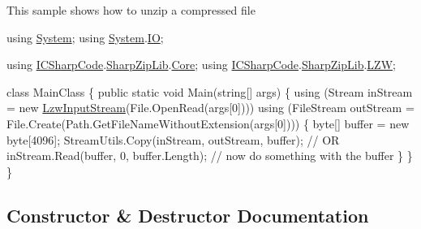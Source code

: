 This sample shows how to unzip a compressed file 
\begin{DoxyCode}
\textcolor{keyword}{using} \hyperlink{namespace_system}{System};
\textcolor{keyword}{using} \hyperlink{namespace_system}{System}.\hyperlink{namespace_system_1_1_i_o}{IO};

\textcolor{keyword}{using} \hyperlink{namespace_i_c_sharp_code}{ICSharpCode}.\hyperlink{namespace_i_c_sharp_code_1_1_sharp_zip_lib}{SharpZipLib}.\hyperlink{namespace_i_c_sharp_code_1_1_sharp_zip_lib_1_1_core}{Core};
\textcolor{keyword}{using} \hyperlink{namespace_i_c_sharp_code}{ICSharpCode}.\hyperlink{namespace_i_c_sharp_code_1_1_sharp_zip_lib}{SharpZipLib}.\hyperlink{namespace_i_c_sharp_code_1_1_sharp_zip_lib_1_1_l_z_w}{LZW};

\textcolor{keyword}{class }MainClass
\{
    \textcolor{keyword}{public} \textcolor{keyword}{static} \textcolor{keywordtype}{void} Main(\textcolor{keywordtype}{string}[] args)
    \{
        \textcolor{keyword}{using} (Stream inStream = \textcolor{keyword}{new} \hyperlink{class_i_c_sharp_code_1_1_sharp_zip_lib_1_1_l_z_w_1_1_lzw_input_stream_a0b2d345fb6423874386e68cf1e13eb93}{LzwInputStream}(File.OpenRead(args[0])))
        \textcolor{keyword}{using} (FileStream outStream = File.Create(Path.GetFileNameWithoutExtension(args[0]))) \{
            byte[] buffer = \textcolor{keyword}{new} byte[4096];
            StreamUtils.Copy(inStream, outStream, buffer);
                        \textcolor{comment}{// OR}
                        inStream.Read(buffer, 0, buffer.Length);
                        \textcolor{comment}{// now do something with the buffer}
        \}
    \}
\}   
\end{DoxyCode}
 

\subsection{Constructor \& Destructor Documentation}
\mbox{\label{class_i_c_sharp_code_1_1_sharp_zip_lib_1_1_l_z_w_1_1_lzw_input_stream_a0b2d345fb6423874386e68cf1e13eb93}} 
